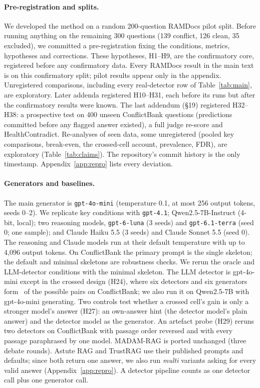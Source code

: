 \paragraph{Pre-registration and splits.}
We developed the method on a random 200-question RAMDocs pilot split. Before running anything on the remaining 300
questions (139 conflict, 126 clean, 35 excluded), we committed a pre-registration fixing the conditions, metrics,
hypotheses and corrections. These hypotheses, H1--H9, are the confirmatory core, registered before any confirmatory
data. Every RAMDocs result in the main text is on this confirmatory split; pilot results appear only in the appendix.
Unregistered comparisons, including every real-detector row of Table~\ref{tab:main}, are exploratory.
Later addenda registered H10--H31, each before its runs but after the confirmatory results were known. The last
addendum (\S19) registered H32--H38: a prospective test on 400 unseen ConflictBank questions (predictions committed
before any flagged answer existed), a full judge re-score and HealthContradict. Re-analyses of seen data, some
unregistered (pooled key comparisons, break-even, the crossed-cell account, prevalence, FDR), are exploratory
(Table~\ref{tab:claims}). The repository's commit history is the only timestamp. Appendix~\ref{app:repro} lists every deviation.

\paragraph{Generators and baselines.}
The main generator is \texttt{gpt-4o-mini} \citep{openai2024gpt4o} (temperature 0.1, at most 256 output tokens, seeds
0--2). We replicate key conditions with \texttt{gpt-4.1}; Qwen2.5-7B-Instruct \citep{yang2024qwen25} (4-bit, local);
two reasoning models, \texttt{gpt-6-luna} (3 seeds) and \texttt{gpt-6.1-terra} (seed 0; one sample); and
Claude Haiku 5.5 (3 seeds) and Claude Sonnet 5.5 (seed 0). The reasoning and Claude models run at their default
temperature with up to 4,096 output tokens. On ConflictBank the primary prompt is
the single skeleton; the default and minimal skeletons are robustness checks. We rerun the oracle and LLM-detector
conditions with the minimal skeleton.
The LLM detector is gpt-4o-mini except in the crossed design (H24), where six detectors and six generators form
\hTwentyFourCells\ of the possible pairs on ConflictBank; we also run it on Qwen2.5-7B with gpt-4o-mini generating. Two controls test
whether a crossed cell's gain is only a stronger model's answer (H27): an own-answer hint (the detector model's plain
answer) and the detector model as the generator. An artefact probe (H29) reruns two detectors on
ConflictBank with passage order reversed and with every passage paraphrased by one model.
MADAM-RAG \citep{wang2025madam} is ported unchanged (three debate rounds). Astute RAG \citep{wang2025astute} and
TrustRAG \citep{zhou2025trustrag} use their published prompts and defaults; since both return one answer, we also run
\emph{multi} variants asking for every valid answer (Appendix~\ref{app:repro}). A detector pipeline counts as one
detector call plus one generator call.

